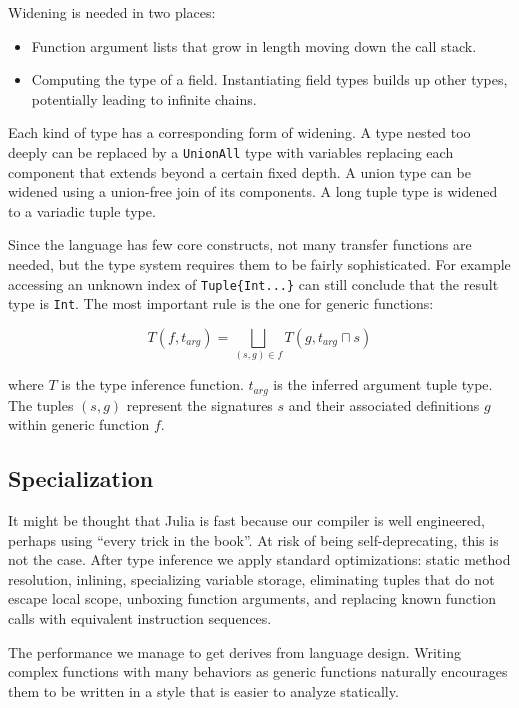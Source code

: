 Widening is needed in two places:

\begin{itemize}
\item Function argument lists that grow in length moving down the call stack.
\item Computing the type of a field. Instantiating field types builds up
other types, potentially leading to infinite chains.
\end{itemize}

\noindent
Each kind of type has a corresponding form of widening.
A type nested too deeply can be replaced by a \texttt{UnionAll} type
with variables replacing each component that extends beyond a certain
fixed depth.
A union type can be widened using a union-free join of its components.
A long tuple type is widened to a variadic tuple type.

Since the language has few core constructs, not many transfer functions
are needed, but the type system requires them to be fairly sophisticated.
For example accessing an unknown index of \texttt{Tuple\{Int...\}} can
still conclude that the result type is \texttt{Int}.
The most important rule is the one for generic functions:

\[
T(f,t_{arg}) = \bigsqcup_{(s,g) \in f}T(g,t_{arg} \sqcap s)
\]

\noindent
where $T$ is the type inference function.
$t_{arg}$ is the inferred argument tuple type.
The tuples $(s,g)$ represent the signatures $s$ and their associated
definitions $g$ within generic function $f$.


\subsection{Specialization}

It might be thought that Julia is fast because our compiler is well
engineered, perhaps using ``every trick in the book''.
At risk of being self-deprecating, this is not the case.
After type inference we apply standard optimizations: static method
resolution, inlining, specializing variable storage, eliminating tuples
that do not escape local scope, unboxing function arguments, and
replacing known function calls with equivalent instruction sequences.

The performance we manage to get derives from language design.
Writing complex functions with many behaviors as generic functions
naturally encourages them to be written in a style that is easier to
analyze statically.

